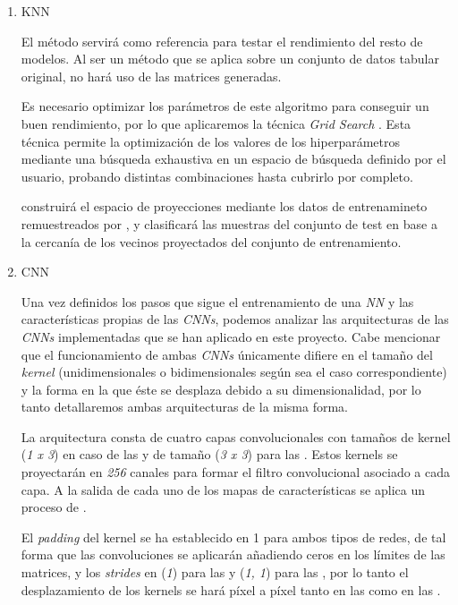         \begin{enumerate}

            \item KNN

                El método  servirá como referencia para testar el rendimiento del resto de modelos. Al ser un método que se aplica sobre un conjunto de datos tabular original, no hará uso de las matrices generadas.

                Es necesario optimizar los parámetros de este algoritmo para conseguir un buen rendimiento, por lo que aplicaremos la técnica \textit{Grid Search} \cite{GridSearchSklearnLibrary}. Esta técnica permite la optimización de los valores de los hiperparámetros mediante una búsqueda exhaustiva en un espacio de búsqueda definido por el usuario, probando distintas combinaciones hasta cubrirlo por completo. 

                 construirá el espacio de proyecciones mediante los datos de entrenamineto remuestreados por , y clasificará las muestras del conjunto de test en base a la cercanía de los vecinos proyectados del conjunto de entrenamiento.


            \item CNN

                Una vez definidos los pasos que sigue el entrenamiento de una \textit{NN} y las características propias de las \textit{CNNs}, podemos analizar las arquitecturas de las \textit{CNNs} implementadas que se han aplicado en este proyecto. Cabe mencionar que el funcionamiento de ambas \textit{CNNs} únicamente difiere en el tamaño del \textit{kernel} (unidimensionales o bidimensionales según sea el caso correspondiente) y la forma en la que éste se desplaza debido a su dimensionalidad, por lo tanto detallaremos ambas arquitecturas de la misma forma.

                La arquitectura consta de cuatro capas convolucionales con tamaños de kernel (\textit{1 x 3}) en caso de las  y de tamaño (\textit{3 x 3}) para las . Estos kernels se proyectarán en \textit{256} canales para formar el filtro convolucional asociado a cada capa. A la salida de cada uno de los mapas de características se aplica un proceso de .

                El \textit{padding} del kernel se ha establecido en 1 para ambos tipos de redes, de tal forma que las convoluciones se aplicarán añadiendo ceros en los límites de las matrices, y los \textit{strides} en (\textit{1}) para las  y (\textit{1, 1}) para las , por lo tanto el desplazamiento de los kernels se hará píxel a píxel tanto en las  como en las .


\end{enumerate}
